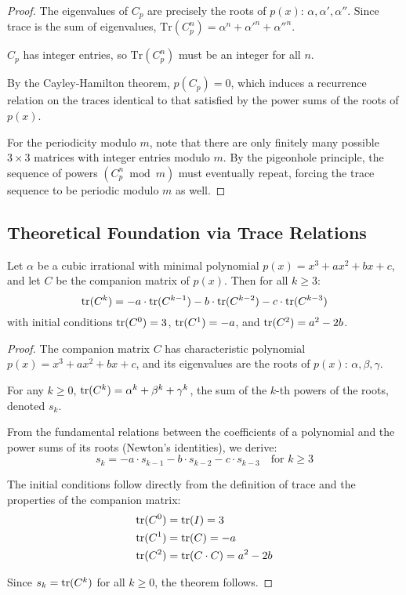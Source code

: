 \begin{proof}
The eigenvalues of $C_p$ are precisely the roots of $p(x)$: $\alpha, \alpha', \alpha''$. Since trace is the sum of eigenvalues, $\text{Tr}(C_p^n) = \alpha^n + \alpha'^n + \alpha''^n$.

$C_p$ has integer entries, so $\text{Tr}(C_p^n)$ must be an integer for all $n$.

By the Cayley-Hamilton theorem, $p(C_p) = 0$, which induces a recurrence relation on the traces identical to that satisfied by the power sums of the roots of $p(x)$.

For the periodicity modulo $m$, note that there are only finitely many possible $3 \times 3$ matrices with integer entries modulo $m$. By the pigeonhole principle, the sequence of powers $(C_p^n \bmod m)$ must eventually repeat, forcing the trace sequence to be periodic modulo $m$ as well.
\end{proof}

\subsection{Theoretical Foundation via Trace Relations}

\begin{theorem}\label{thm:trace_relations}
Let $\alpha$ be a cubic irrational with minimal polynomial $p(x) = x^3 + ax^2 + bx + c$, and let $C$ be the companion matrix of $p(x)$. Then for all $k \geq 3$:
\begin{equation}
\operatorname{tr}(C^k) = -a \cdot \operatorname{tr}(C^{k-1}) - b \cdot \operatorname{tr}(C^{k-2}) - c \cdot \operatorname{tr}(C^{k-3})
\end{equation}
with initial conditions $\operatorname{tr}(C^0) = 3$, $\operatorname{tr}(C^1) = -a$, and $\operatorname{tr}(C^2) = a^2-2b$.
\end{theorem}

\begin{proof}
The companion matrix $C$ has characteristic polynomial $p(x) = x^3 + ax^2 + bx + c$, and its eigenvalues are the roots of $p(x)$: $\alpha, \beta, \gamma$.

For any $k \geq 0$, $\operatorname{tr}(C^k) = \alpha^k + \beta^k + \gamma^k$, the sum of the $k$-th powers of the roots, denoted $s_k$.

From the fundamental relations between the coefficients of a polynomial and the power sums of its roots (Newton's identities), we derive:
\begin{equation}
s_k = -a \cdot s_{k-1} - b \cdot s_{k-2} - c \cdot s_{k-3} \quad \text{for } k \geq 3
\end{equation}

The initial conditions follow directly from the definition of trace and the properties of the companion matrix:
\begin{align}
\operatorname{tr}(C^0) &= \operatorname{tr}(I) = 3 \\
\operatorname{tr}(C^1) &= \operatorname{tr}(C) = -a \\
\operatorname{tr}(C^2) &= \operatorname{tr}(C \cdot C) = a^2-2b
\end{align}

Since $s_k = \operatorname{tr}(C^k)$ for all $k \geq 0$, the theorem follows.
\end{proof}

